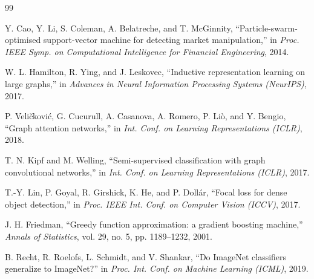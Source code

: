 \documentclass[10pt,twocolumn,letterpaper]{article}
\begin{document}
\begin{thebibliography}{99}


Y. Cao, Y. Li, S. Coleman, A. Belatreche, and T. McGinnity,
``Particle-swarm-optimised support-vector machine for detecting
market manipulation,'' in \emph{Proc. IEEE Symp. on Computational
Intelligence for Financial Engineering}, 2014.

W. L. Hamilton, R. Ying, and J. Leskovec, ``Inductive representation
learning on large graphs,'' in \emph{Advances in Neural Information
Processing Systems (NeurIPS)}, 2017.

P. Veli\v{c}kovi\'{c}, G. Cucurull, A. Casanova, A. Romero, P. Li\`{o},
and Y. Bengio, ``Graph attention networks,'' in \emph{Int. Conf. on
Learning Representations (ICLR)}, 2018.

T. N. Kipf and M. Welling, ``Semi-supervised classification with graph
convolutional networks,'' in \emph{Int. Conf. on Learning
Representations (ICLR)}, 2017.

T.-Y. Lin, P. Goyal, R. Girshick, K. He, and P. Doll\'{a}r,
``Focal loss for dense object detection,'' in \emph{Proc. IEEE Int.
Conf. on Computer Vision (ICCV)}, 2017.

J. H. Friedman, ``Greedy function approximation: a gradient boosting
machine,'' \emph{Annals of Statistics}, vol. 29, no. 5, pp. 1189--1232,
2001.

B. Recht, R. Roelofs, L. Schmidt, and V. Shankar, ``Do ImageNet
classifiers generalize to ImageNet?'' in \emph{Proc. Int. Conf. on
Machine Learning (ICML)}, 2019.


\end{thebibliography}
\end{document}
